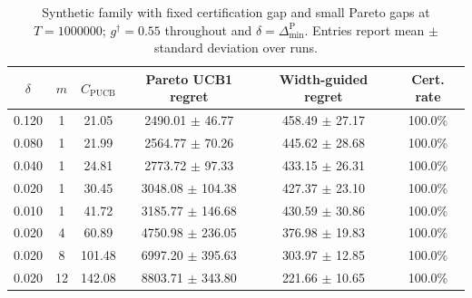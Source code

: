 \begin{table}[t]
\centering
\caption{Synthetic family with fixed certification gap and small Pareto gaps at $T=1000000$; $g^\dagger=0.55$ throughout and $\delta=\Delta_{\min}^{\mathrm{P}}$. Entries report mean $\pm$ standard deviation over runs.}
\label{tab:pucb-vs-width}
\small
\begin{tabular}{cccccc}
\hline
$\delta$ & $m$ & $C_{\mathrm{PUCB}}$ & Pareto UCB1 regret & Width-guided regret & Cert. rate \\
\hline
0.120 & 1 & 21.05 & 2490.01 $\pm$ 46.77 & 458.49 $\pm$ 27.17 & 100.0\% \\
0.080 & 1 & 21.99 & 2564.77 $\pm$ 70.26 & 445.62 $\pm$ 28.68 & 100.0\% \\
0.040 & 1 & 24.81 & 2773.72 $\pm$ 97.33 & 433.15 $\pm$ 26.31 & 100.0\% \\
0.020 & 1 & 30.45 & 3048.08 $\pm$ 104.38 & 427.37 $\pm$ 23.10 & 100.0\% \\
0.010 & 1 & 41.72 & 3185.77 $\pm$ 146.68 & 430.59 $\pm$ 30.86 & 100.0\% \\
0.020 & 4 & 60.89 & 4750.98 $\pm$ 236.05 & 376.98 $\pm$ 19.83 & 100.0\% \\
0.020 & 8 & 101.48 & 6997.20 $\pm$ 395.63 & 303.97 $\pm$ 12.85 & 100.0\% \\
0.020 & 12 & 142.08 & 8803.71 $\pm$ 343.80 & 221.66 $\pm$ 10.65 & 100.0\% \\
\hline
\end{tabular}
\end{table}
